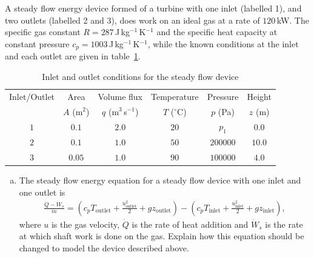 \documentclass[calculator,steamtables,refrigeranttables,psychrometricchart,datasheet,solutions]{exam}
\begin{document}
\begin{question} 

A steady flow energy device formed of a turbine with one inlet (labelled 1), and two outlets (labelled 2 and 3), does work on an ideal gas at a rate of $120$\,kW. The specific gas constant $R=287$\,J\,kg$^{-1}$\,K$^{-1}$ and the specific heat capacity at constant pressure $c_p=1003$\,J\,kg$^{-1}$\,K$^{-1}$, while the known conditions at the inlet and each outlet are given in table~\ref{tab:multiInletOutlet}.

\begin{table}[!h]
\caption{Inlet and outlet conditions for the steady flow device}
\label{tab:multiInletOutlet}
\begin{center}
\begin{tabular}{| c || c | c | c | c | c |} \hline
Inlet/Outlet & Area       & Volume flux          & Temperature    & Pressure & Height  \\
             & $A$ (m$^2$) & $q$ (m$^3$\,s$^{-1}$) & $T$ ($^\circ$C) & $p$ (Pa)  & $z$ (m)  \\ \hline
$1$          & $0.1$      & $2.0$                & $20$           & $p_{1}$     & $0.0$   \\
$2$          & $0.1$      & $1.0$                & $50$           & $200000$ & $10.0$ \\
$3$          & $0.05$     & $1.0$                & $90$           & $100000$ & $4.0$  \\
\hline
\end{tabular}
\end{center}
\end{table}

\begin{enumerate}[(a)]
\item The steady flow energy equation for a steady flow device with one inlet and one outlet is
\begin{align*}
 \frac{\dot{Q} - \dot{W}_s}{\dot{m}} = \left(c_p T_\text{outlet} + \frac{u_\text{outlet}^2}{2} + g z_\text{outlet}\right) - \left(c_p T_\text{inlet} + \frac{u_\text{inlet}^2}{2} + g z_\text{inlet}\right),
\end{align*}
where $u$ is the gas velocity, $\dot{Q}$ is the rate of heat addition and $\dot{W}_s$ is the rate at which shaft work is done on the gas. Explain how this equation should be changed to model the device described above.~
\end{enumerate}
\end{question}
\end{document}
